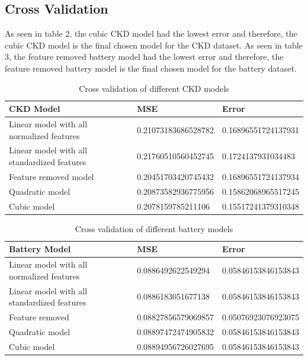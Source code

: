 \documentclass{article}
\begin{document}
\subsection{Cross Validation}

As seen in table 2, the cubic CKD model had the lowest error and therefore, the cubic CKD model is the final chosen model for the CKD dataset.  As seen in table 3, the feature removed battery model had the lowest error and therefore, the feature removed battery model is the final chosen model for the battery dataset. 

\begin{table}[h!]
  \centering
  \caption{Cross validation of different CKD models}
  \begin{tabular}{|l|l|l|}
  \hline
  \textbf{CKD Model}                               & \textbf{MSE}                  & \textbf{Error}               \\ \hline
  Linear model with all normalized features        & 0.21073183686528782           & 0.16896551724137931          \\ \hline
  Linear model with all standardized features      & 0.21760510560452745           & 0.1724137931034483           \\ \hline
  Feature removed model                            & 0.20451703420745432           & 0.16896551724137934          \\ \hline
  Quadratic model                                  & 0.20873582936775956           & 0.15862068965517245          \\ \hline
  Cubic model                                      & 0.2078159785211106            & 0.15517241379310348          \\ \hline
  \end{tabular}
\end{table}

\begin{table}[h!]
  \centering
  \caption{Cross validation of different battery models}
  \begin{tabular}{|l|l|l|}
  \hline
  \textbf{Battery Model}                            & \textbf{MSE}                  & \textbf{Error}               \\ \hline
  Linear model with all normalized features         & 0.0886492622549294            & 0.05846153846153843          \\ \hline
  Linear model with all standardized features       & 0.0886183051677138            & 0.05846153846153843          \\ \hline
  Feature removed                                   & 0.08827856579069857           & 0.05076923076923075           \\ \hline
  Quadratic model                                   & 0.08897472474905832           & 0.05846153846153843          \\ \hline
  Cubic model                                       & 0.08894956726027695           & 0.05846153846153843          \\ \hline
  \end{tabular}
\end{table}
\end{document}
